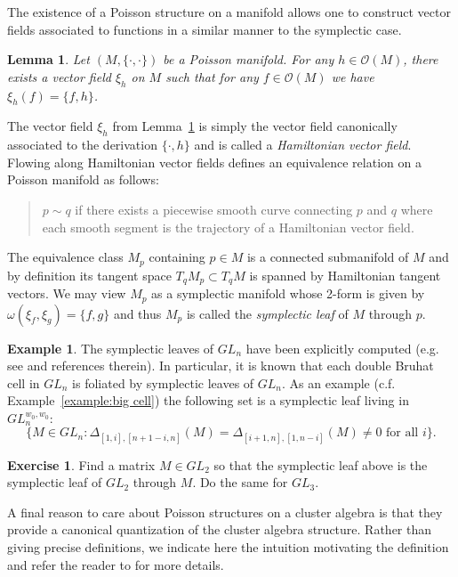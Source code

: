 \documentclass{amsart}
\newtheorem{lemma}[theorem]{Lemma}
\theoremstyle{definition}
\newtheorem{example}[theorem]{Example}
\newtheorem{exercise}[theorem]{Exercise}
\theoremstyle{remark}
\numberwithin{equation}{section}
\newcommand{\cO}{{\mathcal{O}}}
\begin{document}
  The existence of a Poisson structure on a manifold allows one to construct vector fields associated to functions in a similar manner to the symplectic case.
  \begin{lemma}\label{le:Hamiltonian vector fields}
    Let $(M,\{\cdot,\cdot\})$ be a Poisson manifold.  For any $h\in\cO(M)$, there exists a vector field $\xi_h$ on $M$ such that for any $f\in\cO(M)$ we have $\xi_h(f)=\{f,h\}$.
  \end{lemma}
  The vector field $\xi_h$ from Lemma~\ref{le:Hamiltonian vector fields} is simply the vector field canonically associated to the derivation $\{\cdot,h\}$ and is called a \emph{Hamiltonian vector field}.  Flowing along Hamiltonian vector fields defines an equivalence relation on a Poisson manifold as follows: 
  \begin{quotation}
    $p\sim q$ if there exists a piecewise smooth curve connecting $p$ and $q$ where each smooth segment is the trajectory of a Hamiltonian vector field.
  \end{quotation}
  The equivalence class $M_p$ containing $p\in M$ is a connected submanifold of $M$ and by definition its tangent space $T_qM_p\subset T_qM$ is spanned by Hamiltonian tangent vectors.  We may view $M_p$ as a symplectic manifold whose 2-form is given by $\omega(\xi_f,\xi_g)=\{f,g\}$ and thus $M_p$ is called the \emph{symplectic leaf} of $M$ through $p$.
  \begin{example}
    The symplectic leaves of $GL_n$ have been explicitly computed (e.g. see \cite{KZ02} and references therein).  In particular, it is known that each double Bruhat cell in $GL_n$ is foliated by symplectic leaves of $GL_n$.  As an example (c.f. Example~\ref{example:big cell}) the following set is a symplectic leaf living in $GL_n^{w_0,w_0}$:
    \[\{M\in GL_n:\Delta_{[1,i],[n+1-i,n]}(M)=\Delta_{[i+1,n],[1,n-i]}(M)\ne0\text{ for all $i$}\}.\]
  \end{example}
  \begin{exercise}
    Find a matrix $M\in GL_2$ so that the symplectic leaf above is the symplectic leaf of $GL_2$ through $M$.  Do the same for $GL_3$.
  \end{exercise}

  A final reason to care about Poisson structures on a cluster algebra is that they provide a canonical quantization of the cluster algebra structure.  Rather than giving precise definitions, we indicate here the intuition motivating the definition and refer the reader to \cite{BZ05} for more details.
\end{document}
